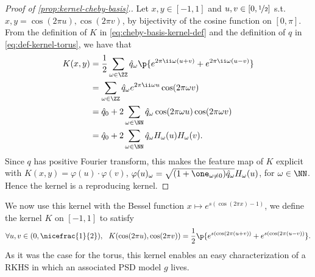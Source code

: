 \documentclass{article}
\begin{document}
\begin{proof}[Proof of \cref{prop:kernel-cheby-basis}.]
  Let $x, y \in [-1, 1]$ and $u, v \in [0, \nicefrac{1}{2}]$ s.t. $x, y = \cos (2\pi u), \cos (2 \pi v)$, by bijectivity of the cosine function on $[0, \pi]$. From the definition of $K$ in \cref{eq:cheby-basis-kernel-def} and the definition of $q$ in \cref{eq:def-kernel-torus}, we have that
  \begin{align*}
    K(x, y)
     & = \frac{1}{2} \sum_{\omega \in \ZZ} \hat{q}_\omega \p{e^{2 \pi \ii \omega (u + v)} + e^{2 \pi \ii \omega (u - v)}} \\
     & = \sum_{\omega \in \ZZ} \hat{q}_\omega e^{2 \pi \ii \omega u} \cos(2 \pi \omega v)                                 \\
     & = \hat{q}_0 + 2 \sum_{\omega \in \NN} \hat{q}_\omega \cos(2 \pi \omega u) \cos(2 \pi \omega v)                     \\
     & = \hat{q}_0 + 2 \sum_{\omega \in \NN} \hat{q}_\omega H_\omega(u) H_\omega(v).
  \end{align*}
  Since $q$ has positive Fourier transform, this makes the feature map of $K$ explicit with $K(x, y) = \varphi(u) \cdot \varphi(v)$, $\varphi(u)_\omega = \sqrt{(1 + \one_{\omega \neq 0}) \hat{q}_\omega} H_\omega(u)$, for $\omega \in \NN$. Hence the kernel is a reproducing kernel.
\end{proof}

We now use this kernel with the Bessel function $x \mapsto e^{s (\cos(2 \pi x) - 1)}$, \ie we define the kernel $K$ on $[-1, 1]$ to satisfy
\begin{equation}\label{eq:def-bessel-kernel-cheby}
  \forall u, v \in (0, \nicefrac{1}{2}), ~~ K(\cos(2 \pi u), \cos(2 \pi v)) = \frac{1}{2} \p{e^{s(\cos(2 \pi (u + v))} + e^{s(\cos(2 \pi (u - v))}}.
\end{equation}
As it was the case for the torus, this kernel enables an easy characterization of a RKHS in which an associated PSD model $g$ lives.
\end{document}
